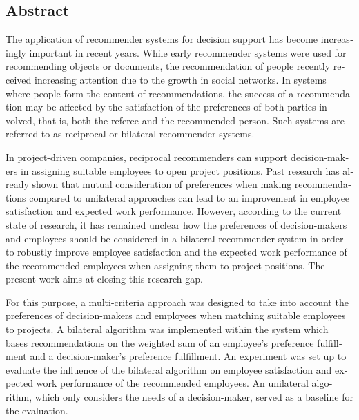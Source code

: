 
\begin{otherlanguage}{american}
	\chapter*{Abstract}
	

	The application of recommender systems for decision support has become increasingly important in recent years.
	While early recommender systems were used for recommending objects or documents, the recommendation of people recently received increasing attention due to the growth in social networks.
	In systems where people form the content of recommendations, the success of a recommendation may be affected by the satisfaction of the preferences of both parties involved, that is, both the referee and the recommended person.
	Such systems are referred to as reciprocal or bilateral recommender systems.
	
	In project-driven companies, reciprocal recommenders can support decision-makers in assigning suitable employees to open project positions.
	Past research has already shown that mutual consideration of preferences when making recommendations compared to unilateral approaches can lead to an improvement in employee satisfaction and expected work performance.
	However, according to the current state of research, it has remained unclear how the preferences of decision-makers and employees should be considered in a bilateral recommender system in order to robustly improve employee satisfaction and the expected work performance of the recommended employees when assigning them to project positions.
	The present work aims at closing this research gap.
	
	For this purpose, a multi-criteria approach was designed to take into account the preferences of decision-makers and employees when matching suitable employees to projects.
	A bilateral algorithm was implemented within the system which bases recommendations on the weighted sum of an employee's preference fulfillment and a decision-maker's preference fulfillment.
	An experiment was set up to evaluate the influence of the bilateral algorithm on employee satisfaction and expected work performance of the recommended employees.
	An unilateral algorithm, which only considers the needs of a decision-maker, served as a baseline for the evaluation.
	

\end{otherlanguage}
